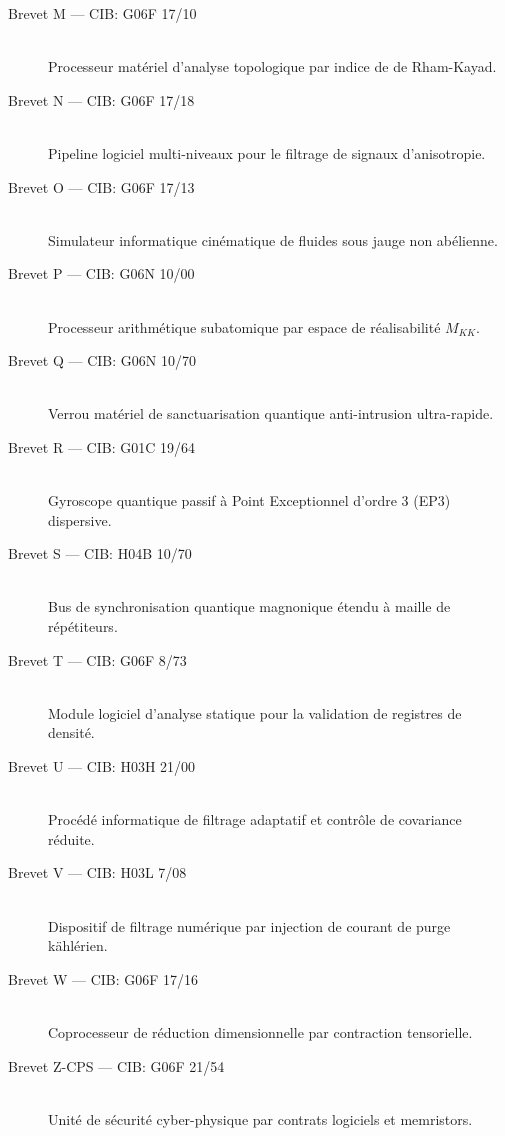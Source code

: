 \begin{description}
    \item[Brevet M --- CIB: G06F 17/10] \hfill \\ Processeur matériel d'analyse topologique par indice de de Rham-Kayad.
    \item[Brevet N --- CIB: G06F 17/18] \hfill \\ Pipeline logiciel multi-niveaux pour le filtrage de signaux d'anisotropie.
    \item[Brevet O --- CIB: G06F 17/13] \hfill \\ Simulateur informatique cinématique de fluides sous jauge non abélienne.
    \item[Brevet P --- CIB: G06N 10/00] \hfill \\ Processeur arithmétique subatomique par espace de réalisabilité $M_{KK}$.
    \item[Brevet Q --- CIB: G06N 10/70] \hfill \\ Verrou matériel de sanctuarisation quantique anti-intrusion ultra-rapide.
    \item[Brevet R --- CIB: G01C 19/64] \hfill \\ Gyroscope quantique passif à Point Exceptionnel d'ordre 3 (EP3) dispersive.
    \item[Brevet S --- CIB: H04B 10/70] \hfill \\ Bus de synchronisation quantique magnonique étendu à maille de répétiteurs.
    \item[Brevet T --- CIB: G06F 8/73] \hfill \\ Module logiciel d'analyse statique pour la validation de registres de densité.
    \item[Brevet U --- CIB: H03H 21/00] \hfill \\ Procédé informatique de filtrage adaptatif et contrôle de covariance réduite.
    \item[Brevet V --- CIB: H03L 7/08] \hfill \\ Dispositif de filtrage numérique par injection de courant de purge kählérien.
    \item[Brevet W --- CIB: G06F 17/16] \hfill \\ Coprocesseur de réduction dimensionnelle par contraction tensorielle.
    \item[Brevet Z-CPS --- CIB: G06F 21/54] \hfill \\ Unité de sécurité cyber-physique par contrats logiciels et memristors.
\end{description}


